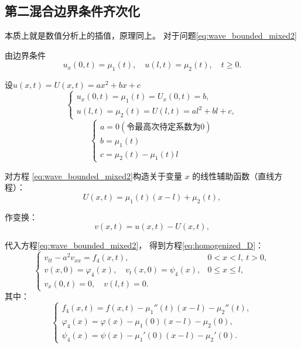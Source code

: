 \documentclass[a4paper, 12pt, oneside]{article} %
\numberwithin{subsection}{section}
\numberwithin{subsubsection}{subsection}
\theoremstyle{plain}
\theoremstyle{definition}
\theoremstyle{remark}
\begin{document}
		
		\subsection{第二混合边界条件齐次化}
		本质上就是数值分析上的插值，原理同上。
		对于问题\eqref{eq:wave_bounded_mixed2}
		
		由边界条件
		\begin{equation}
			u_x(0,t) = \mu_1(t), \quad u(l,t) = \mu_2(t), \quad t \geq 0.
		\end{equation}
		
		设$u(x, t)=U(x, t)=ax^2+bx+c$
		\[
		\begin{cases}
			u_x(0, t) = \mu_1(t) = U_x(0, t) = b, \\
			u(l, t) = \mu_2(t) = U(l, t) = al^2 + bl+c,
		\end{cases}
		\]
		\[
		\begin{cases}
			a = 0 (\text{令最高次待定系数为0})\\
			b =\mu_1(t) \\
			c = \mu_2(t)-\mu_1(t)l
		\end{cases}
		\]
		
		对方程 \eqref{eq:wave_bounded_mixed2}构造关于变量 \(x\) 的线性辅助函数（直线方程）：
		\begin{equation}
			U(x, t) = \mu_1(t)(x-l) + \mu_2(t) ,
		\end{equation}
		
		作变换：
		\begin{equation}
			v(x, t) = u(x, t) - U(x, t),
		\end{equation}
		
		代入方程\eqref{eq:wave_bounded_mixed2}，
		得到方程\eqref{eq:homogenized_D}：
		\begin{equation}\label{eq:homogenized_D}
			\begin{cases}
				v_{tt} - a^2 v_{xx} = f_4(x, t), & 0 < x < l, \ t > 0, \\
				v(x, 0) = \varphi_4(x), \quad v_t(x, 0) = \psi_4(x), & 0 \leq x \leq l, \\
				v_x(0, t) = 0, \quad v(l, t) = 0. &  %
			\end{cases}
		\end{equation}
		其中：
		\begin{equation}
			\begin{cases}
				f_4(x, t) = f(x, t) - \mu_1''(t) (x-l)- \mu_2''(t) , \\
				\varphi_4(x) = \varphi(x) - \mu_1(0)(x-l)- \mu_2(0), \\
				\psi_4(x) = \psi(x) - \mu_1'(0)(x-l) - \mu_2'(0).
			\end{cases}
		\end{equation}
		
\end{document}
